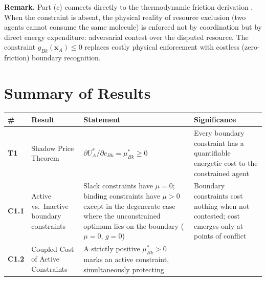 \documentclass[11pt]{article}
\theoremstyle{plain}
\theoremstyle{definition}
\theoremstyle{remark}
\newcounter{none}
\let\origsection\section
\renewcommand{\section}{\needspace{12\baselineskip}\origsection}
\begin{document}
\textbf{Remark.} Part (c) connects directly to the thermodynamic
friction derivation \citep{TC-IV}. When the constraint is absent, the
physical reality of resource exclusion (two agents cannot consume the
same molecule) is enforced not by coordination but by direct energy
expenditure: adversarial contest over the disputed resource. The
constraint \(g_{Bk}(\mathbf{x}_A) \leq 0\) replaces costly physical
enforcement with costless (zero-friction) boundary recognition.

\section{Summary of Results}\label{summary-of-results}

{\def\LTcaptype{none} %
\begin{longtable}[]{@{}
  >{\raggedright\arraybackslash}p{}
  >{\raggedright\arraybackslash}p{}
  >{\raggedright\arraybackslash}p{}
  >{\raggedright\arraybackslash}p{}@{}}
\toprule\noalign{}
\begin{minipage}[b]{\linewidth}\raggedright
\#
\end{minipage} & \begin{minipage}[b]{\linewidth}\raggedright
Result
\end{minipage} & \begin{minipage}[b]{\linewidth}\raggedright
Statement
\end{minipage} & \begin{minipage}[b]{\linewidth}\raggedright
Significance
\end{minipage} \\
\midrule\noalign{}
\endhead
\bottomrule\noalign{}
\endlastfoot
\textbf{T1} & Shadow Price Theorem &
\(\partial U_A^* / \partial c_{Bk} = \mu_{Bk}^* \geq 0\) & Every
boundary constraint has a quantifiable energetic cost to the constrained
agent \\
\textbf{C1.1} & Active vs.~Inactive boundary constraints & Slack
constraints have \(\mu = 0\); binding constraints have \(\mu > 0\)
except in the degenerate case where the unconstrained optimum lies on
the boundary (\(\mu = 0\), \(g = 0\)) & Boundary constraints cost
nothing when not contested; cost emerges only at points of conflict \\
\textbf{C1.2} & Coupled Cost of Active Constraints & A strictly positive
\(\mu_{Bk}^* > 0\) marks an active constraint, simultaneously protecting

\end{longtable}}
\end{document}
